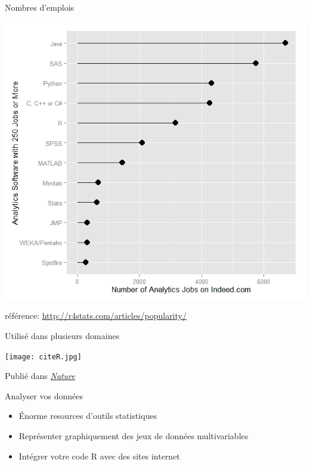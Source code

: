 \documentclass[11pt]{beamer}\usepackage[]{graphicx}\usepackage[]{color}
\begin{document}
\begin{frame}{Nombres d'emplois}

\begin{center}
\includegraphics[scale=0.47]{jobs.png}
\end{center}

\vspace{0.05in}

r\'{e}f\'{e}rence: \href{http://r4stats.com/articles/popularity/}{http://r4stats.com/articles/popularity/}\\

\end{frame}



\begin{frame}{Utilis\'{e} dans plusieurs domaines}

\begin{center}
\texttt{[image: citeR.jpg]}
\end{center}

\vspace{0.05in}

Publi\'{e} dans \href{http://www.nature.com/news/programming-tools-adventures-with-r-1.16609}{\textit{Nature}}
\end{frame}


\begin{frame}{Analyser vos données}
\begin{itemize}
  \setlength\itemsep{2em}
\item \'{E}norme resources d'outils statistiques
\item Représenter graphiquement des jeux de données multivariables
\item Intégrer votre code R avec des sites internet
\end{itemize}
\end{frame}
\end{document}
